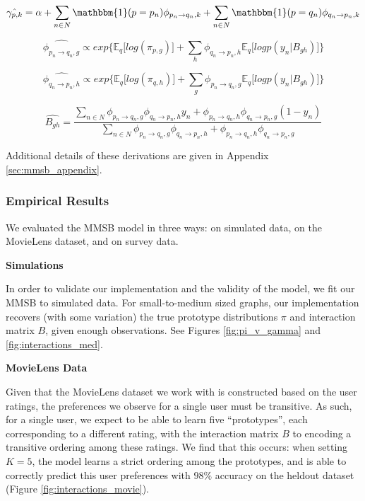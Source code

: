 \[
\hat{\gamma_{p,k}} = \alpha + \sum_{n \in N} \mathbbm{1}(p = p_n)\phi_{p_n \rightarrow q_n,k} + \sum_{n \in N} \mathbbm{1}(p = q_n)\phi_{q_n \rightarrow p_n,k}
\]

\[
\hat{\phi_{p_n \rightarrow q_n,g}} \propto exp\bigg\{\mathbb{E}_q\big[log(\pi_{p,g})\big] + \sum_{h}\phi_{q_n \rightarrow p_n,h}\mathbb{E}_q\big[logp(y_n|B_{gh})\big]\bigg\}
\]

\[
\hat{\phi_{q_n \rightarrow p_n,h}} \propto exp\bigg\{\mathbb{E}_q\big[log(\pi_{q,h})\big] + \sum_{g}\phi_{p_n \rightarrow q_n,g}\mathbb{E}_q\big[logp(y_n|B_{gh})\big]\bigg\}
\]

\[
\hat{B_{gh}} = \frac{
\sum_{n \in N} \phi_{p_n \rightarrow q_n, g} \phi_{q_n \rightarrow p_n, h} y_n + \phi_{p_n \rightarrow q_n, h} \phi_{q_n \rightarrow p_n, g}(1-y_n)
}{
\sum_{n \in N} \phi_{p_n \rightarrow q_n, g} \phi_{q_n \rightarrow p_n, h} + \phi_{p_n \rightarrow q_n, h} \phi_{q_n \rightarrow p_n, g}
}
\]

Additional details of these derivations are given in Appendix \ref{sec:mmsb_appendix}.

\subsubsection{Empirical Results}

We evaluated the MMSB model in three ways: on simulated data, on the MovieLens dataset, and on survey data.

\bigskip
\textbf{Simulations}

In order to validate our implementation and the validity of the model, we fit our MMSB to simulated data.
For small-to-medium sized graphs, our implementation recovers (with some variation) the true prototype distributions $\pi$ and interaction matrix $B$, given enough observations. See Figures \ref{fig:pi_v_gamma} and \ref{fig:interactions_med}.

\bigskip
\textbf{MovieLens Data}

Given that the MovieLens dataset we work with is constructed based on the
user ratings, the preferences we observe for a single user must be transitive.
As such, for a single user, we expect to be able to learn five ``prototypes'', 
each corresponding to a different rating, with the
interaction matrix $B$ to encoding a transitive ordering among these ratings.
We find that this occurs: when setting $K=5$, the model 
learns a strict ordering among the prototypes, and is able to correctly predict 
this user preferences with $98\%$ accuracy on the heldout dataset (Figure \ref{fig:interactions_movie}).  


